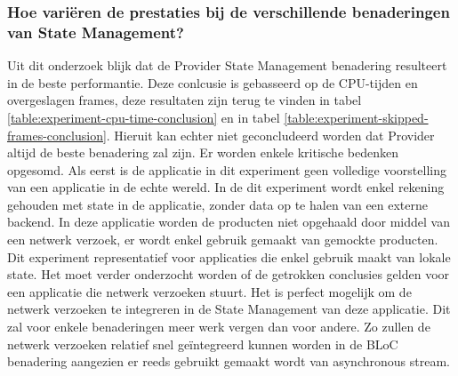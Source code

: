 \subsubsection{Hoe variëren de prestaties bij de verschillende benaderingen van State Management?}

Uit dit onderzoek blijk dat de Provider State Management benadering resulteert in de beste performantie. Deze conlcusie is gebasseerd op de CPU-tijden en overgeslagen frames, deze resultaten zijn terug te vinden in tabel \ref{table:experiment-cpu-time-conclusion} en in tabel \ref{table:experiment-skipped-frames-conclusion}. Hieruit kan echter niet geconcludeerd worden dat Provider altijd de beste benadering zal zijn. Er worden enkele kritische bedenken opgesomd. \newline \newline
Als eerst is de applicatie in dit experiment geen volledige voorstelling van een applicatie in de echte wereld. In de dit experiment wordt enkel rekening gehouden met state in de applicatie, zonder data op te halen van een externe backend. In deze applicatie worden de producten niet opgehaald door middel van een netwerk verzoek, er wordt enkel gebruik gemaakt van gemockte producten. Dit experiment representatief voor applicaties die enkel gebruik maakt van lokale state. Het moet verder onderzocht worden of de getrokken conclusies gelden voor een applicatie die netwerk verzoeken stuurt. \newline
Het is perfect mogelijk om de netwerk verzoeken te integreren in de State Management van deze applicatie. Dit zal voor enkele benaderingen meer werk vergen dan voor andere. Zo zullen de netwerk verzoeken relatief snel geïntegreerd kunnen worden in de BLoC benadering aangezien er reeds gebruikt gemaakt wordt van asynchronous stream. \newline 

